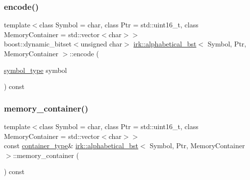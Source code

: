 \mbox{\label{classirk_1_1alphabetical__bst_a4d63267c3e8de620411494f5b49fa2a2}} 
\subsubsection{\texorpdfstring{encode()}{encode()}\hspace{0.1cm}{\footnotesize\ttfamily [3/3]}}
{\footnotesize\ttfamily template$<$class Symbol = char, class Ptr = std\+::uint16\+\_\+t, class Memory\+Container = std\+::vector$<$char$>$$>$ \\
boost\+::dynamic\+\_\+bitset$<$unsigned char$>$ \mbox{\hyperlink{classirk_1_1alphabetical__bst}{irk\+::alphabetical\+\_\+bst}}$<$ Symbol, Ptr, Memory\+Container $>$\+::encode (\begin{DoxyParamCaption}\item[{\mbox{\hyperlink{classirk_1_1alphabetical__bst_a296ccb8fa9fa9dce3b3c3beab0a5ca28}{symbol\+\_\+type}}}]{symbol }\end{DoxyParamCaption}) const\hspace{0.3cm}{\ttfamily [inline]}}

\mbox{\label{classirk_1_1alphabetical__bst_a273b1d4ffff62f2f8a034d979062e43c}} 
\subsubsection{\texorpdfstring{memory\+\_\+container()}{memory\_container()}}
{\footnotesize\ttfamily template$<$class Symbol = char, class Ptr = std\+::uint16\+\_\+t, class Memory\+Container = std\+::vector$<$char$>$$>$ \\
const \mbox{\hyperlink{classirk_1_1alphabetical__bst_aeed9efc6a48ff6d504a608e06223f386}{container\+\_\+type}}\& \mbox{\hyperlink{classirk_1_1alphabetical__bst}{irk\+::alphabetical\+\_\+bst}}$<$ Symbol, Ptr, Memory\+Container $>$\+::memory\+\_\+container (\begin{DoxyParamCaption}{ }\end{DoxyParamCaption}) const\hspace{0.3cm}{\ttfamily [inline]}}

